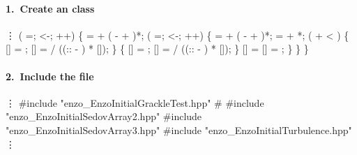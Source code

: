 \begin{frame}[fragile] 
\secframetitle{\ssDevelInitial}
\framesubtitle{1.~Create an  class}
\scriptsize
\begin{semiverbatim}
      \vdots
    ( =; <-; ++) \{
        =  + ( -  + )*;
       ( =; <-; ++) \{
           =  + ( -  + )*;
           =  + *;
          ( +  < ) \{
            []  = ;
            [] =  / ((:: - ) * []);
         \}  \{
            []  = ;
            [] =  / ((:: - ) * []);
         \}
         [] = [] = ;
      \}
   \}
\}
\end{semiverbatim}
\end{frame}


\begin{frame}[fragile] 
\secframetitle{\ssDevelInitial}
\framesubtitle{2.~Include the  file}

%
\begin{semiverbatim}
       \vdots
   #include "enzo_EnzoInitialGrackleTest.hpp"
   # 
   #include "enzo_EnzoInitialSedovArray2.hpp"
   #include "enzo_EnzoInitialSedovArray3.hpp"
   #include "enzo_EnzoInitialTurbulence.hpp"
       \vdots
\end{semiverbatim}


\end{frame}


